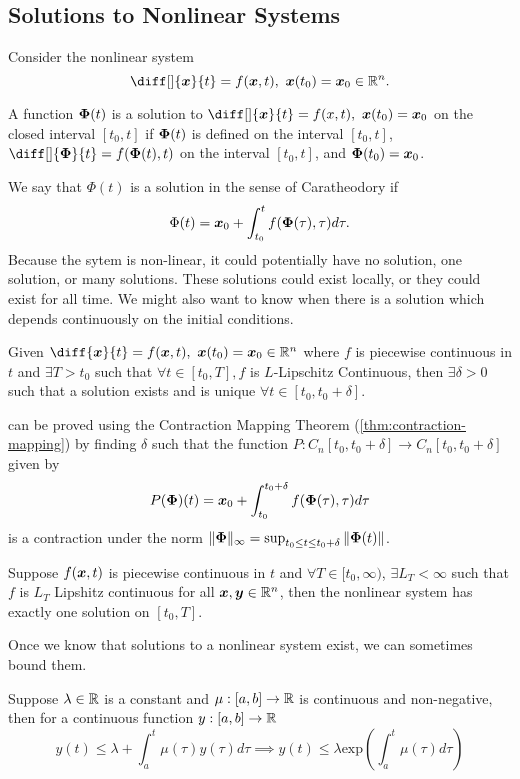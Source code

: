 \subsection{Solutions to Nonlinear Systems}
Consider the nonlinear system \[
	\diff[]{\bs{x}}{t} = f(\bs{x}, t),\ \bs{x}(t_0) = \bs{x}_0\in \R^n.
\]
\begin{definition}
	A function $\boldsymbol{\Phi}(t)$ is a solution to $\diff[]{\bs{x}}{t} = f(x, t),\
	\bs{x}(t_0) = \bs{x}_0$ on the closed interval $[t_0, t]$ if $\boldsymbol{\Phi}(t)$
	is defined on the interval $[t_0, t]$, $\diff[]{\bs{\Phi}}{t} =
	f(\bs{\Phi}(t), t)$ on the interval $[t_0, t]$, and $\boldsymbol{\Phi}(t_0) =
	\boldsymbol{x}_0$.
	\label{defn:nonlinear-solution}
\end{definition}
We say that $\Phi(t)$ is a solution in the sense of Caratheodory if \[
	\Phi(t) = \boldsymbol{x}_0 + \int_{t_0}^t f(\boldsymbol{\Phi}(\tau), \tau)d\tau.
\]
Because the sytem is non-linear, it could potentially have no solution, one
solution, or many solutions. These solutions could exist locally, or they could
exist for all time. We might also want to know when there is a solution which
depends continuously on the initial conditions.
\begin{theorem}
	Given $\diff{\bs{x}}{t} = f(\bs{x}, t),\ \bs{x}(t_0) = \bs{x}_0\in\R^n$ where
	$f$ is piecewise continuous in $t$ and $\exists T>t_0$ such that $\forall t\in
	[t_0, T], f$ is $L$-Lipschitz Continuous, then $\exists \delta > 0$ such that a
	solution exists and is unique $\forall t\in [t_0, t_0 + \delta]$.
	\label{thm:local-existence}
\end{theorem}
 can be proved using the Contraction Mapping Theorem
(\cref{thm:contraction-mapping}) by finding $\delta$ such that the function
$P:C_n[t_0, t_0+\delta] \to C_n[t_0, t_0+\delta]$ given by \[
	P(\boldsymbol{\Phi})(t) = \boldsymbol{x}_0 + \int_{t_0}^{t_0+\delta} f(\boldsymbol{\Phi}(\tau),
	\tau)d\tau
\]
is a contraction under the norm $\|\boldsymbol{\Phi}\|_\infty = \sup_{t_0\leq t \leq
t_0+\delta} \|\boldsymbol{\Phi}(t)\|$.
\begin{theorem}
	Suppose $f(\boldsymbol{x}, t)$ is piecewise continuous in $t$ and $\forall T\in [t_0,
	\infty)$, $\exists L_T < \infty$ such that $f$ is $L_T$ Lipshitz continuous
	for all $\boldsymbol{x}, \boldsymbol{y} \in \mathbb{R}^n$, then the nonlinear system  has exactly one
	solution on $[t_0, T]$.
	\label{thm:global-existence}
\end{theorem}
Once we know that solutions to a nonlinear system exist, we can sometimes bound
them.
\begin{theorem}
	Suppose $\lambda\in\mathbb{R}$ is a constant and $\mu:[a,b]\to\mathbb{R}$ is continuous and
	non-negative, then for a continuous function $y:[a, b]\to\mathbb{R}$ \[
		y(t) \leq \lambda + \int_a^t \mu(\tau)y(\tau)d\tau \implies y(t) \leq
		\lambda \text{exp}\left(\int_a^t\mu(\tau)d\tau\right)
	\]
	\label{thm:bellman-gronwall}
\end{theorem}
